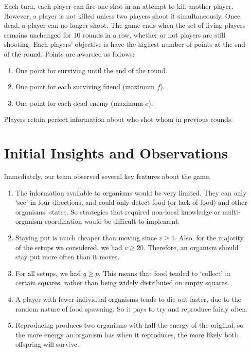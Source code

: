 \documentclass[
10pt, %
letterpaper, %
oneside, %
headinclude,footinclude, %
english
]{article}
\begin{document}
Each turn, each player can fire one shot in an attempt to kill another player. However, a player is not killed unless two players shoot it simultaneously. Once dead, a player can no longer shoot. The game ends when the set of living players remains unchanged for 10 rounds in a row, whether or not players are still shooting. Each players' objective is have the highest number of points at the end of the round. Points are awarded as follows:
\begin{enumerate}
  \item One point for surviving until the end of the round.
  \item One point for each surviving friend (maximum $f$).
  \item One point for each dead enemy (maximum $e$).
\end{enumerate}

Players retain perfect information about who shot whom in previous rounds.

\section{Initial Insights and Observations}

Immediately, our team observed several key features about the game.

\begin{enumerate}
  \item The information available to organisms would be very limited. They can only `see' in four directions, and could only detect food (or lack of food) and other organisms' states. So strategies that required non-local knowledge or multi-organism coordination would be difficult to implement.
  \item Staying put is much cheaper than moving since $v \geq 1$. Also, for the majority of the setups we considered, we had $v \geq 20$. Therefore, an organism should stay put more often than it moves.
  \item For all setups, we had $q \geq p$. This means that food tended to `collect' in certain squares, rather than being widely distributed on empty squares.
  \item A player with fewer individual organisms tends to die out faster, due to the random nature of food spawning. So it pays to try and reproduce fairly often.
  \item Reproducing produces two organisms with half the energy of the original, so the more energy an organism has when it reproduces, the more likely both offspring will survive.
\end{enumerate}
\end{document}
